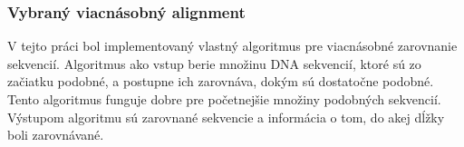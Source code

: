 \subsubsection{Vybraný viacnásobný alignment}
V tejto práci bol implementovaný vlastný algoritmus pre viacnásobné zarovnanie sekvencií.
Algoritmus ako vstup berie množinu DNA sekvencií, ktoré sú zo začiatku podobné, a postupne ich zarovnáva, dokým sú dostatočne podobné.
Tento algoritmus funguje dobre pre početnejšie množiny podobných sekvencií.
Výstupom algoritmu sú zarovnané sekvencie a informácia o tom, do akej dĺžky boli zarovnávané.


 